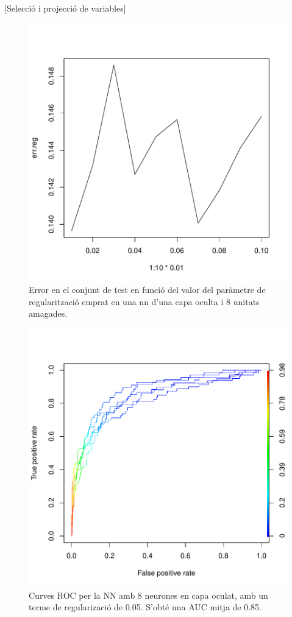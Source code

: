 \documentclass[a4paper,10pt]{article}
\begin{document}
[Selecció i projecció de variables]


\begin{center}
\begin{figure}
\includegraphics[width=5in]{memoria-nn_regular}
\caption{Error en el conjunt de test en funció del valor del paràmetre de regularització emprat en una nn d'una capa oculta i 8 unitats amagades.} \label{fig:nn_regular}
\end{figure}
\end{center}

\begin{center}
\begin{figure}
\includegraphics[width=5in]{memoria-nn_roc}
\caption{Curves ROC per la NN amb 8 neurones en capa oculat, amb un terme de regularizació de 0.05. S'obté una AUC mitja de 0.85.} \label{fig:nn_roc}
\end{figure}
\end{center}
\end{document}
